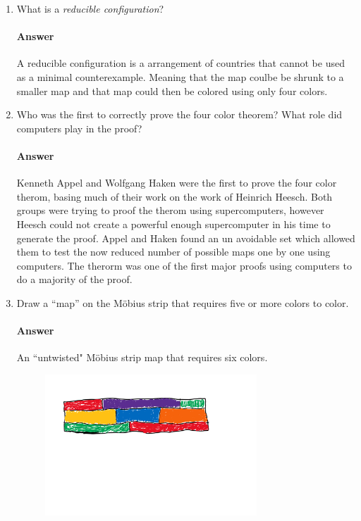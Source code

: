 \documentclass{article}
\begin{document}
\begin{enumerate}

    \item What is a \emph{reducible configuration}?

        \paragraph{Answer}
		
	   A reducible configuration is a arrangement of countries that cannot be used as a minimal counterexample. Meaning that the map coulbe be shrunk to a smaller map and that map could then be colored using only four colors.
        



    \item Who was the first to correctly prove the four color theorem?  What
        role did computers play in the proof?

        \paragraph{Answer}

        Kenneth Appel and Wolfgang Haken were the first to prove the four color therom, basing much of their work on the work of Heinrich Heesch. Both groups were trying to proof the therom using supercomputers, however Heesch could not create a powerful enough supercomputer in his time to generate the proof. Appel and Haken found an un avoidable set which allowed them to test the now reduced number of possible maps one by one using computers. The therorm was one of the first major proofs using computers to do a majority of the proof.



    \item Draw a ``map'' on the M\"obius strip that requires five or more colors
        to color.

        \paragraph{Answer}

		An ``untwisted" M\"obius strip map that requires six colors.
        \begin{figure}[h]
		\centering
			\includegraphics[width=0.75\textwidth]{H-6_4}
		\end{figure}


\end{enumerate}
\end{document}

